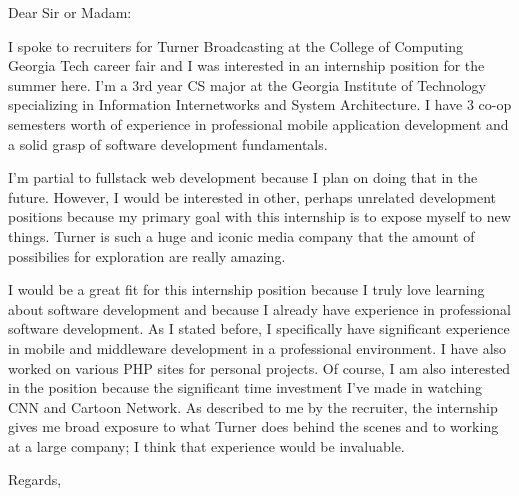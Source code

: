 \documentclass{letter}
\begin{document}
\begin{letter}{}
\opening{Dear Sir or Madam:}

I spoke to recruiters for Turner Broadcasting at the College of Computing Georgia Tech career fair and I was interested in an internship position for the summer here. I'm a 3rd year CS major at the Georgia Institute of Technology specializing in Information Internetworks and System Architecture. I have 3 co-op semesters worth of experience in professional mobile application development and a solid grasp of software development fundamentals. 

I'm partial to fullstack web development because I plan on doing that in the future. However, I would be interested in other, perhaps unrelated development positions because my primary goal with this internship is to expose myself to new things. Turner is such a huge and iconic media company that the amount of possibilies for exploration are really amazing.

I would be a great fit for this internship position because I truly love learning about software development and because I already have experience in professional software development.  As I stated before, I specifically have significant experience in mobile and middleware development in a professional environment. I have also worked on various PHP sites for personal projects. Of course, I am also interested in the position because the significant time investment I've made in watching CNN and Cartoon Network. As described to me by the recruiter, the internship gives me broad exposure to what Turner does behind the scenes and to working at a large company; I think that experience would be invaluable.


\closing{Regards,}
\end{letter}
\end{document}
